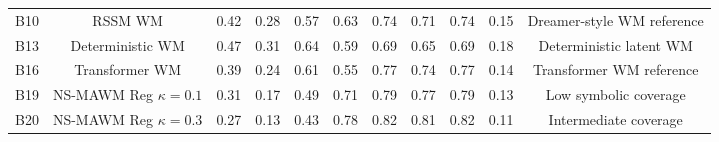 \begin{table}[h!]
{\begin{tabular}{lcccccccccc}
            \midrule

            B10                      &
            RSSM WM                  &
            0.42                     &
            0.28                     &
            0.57                     &
            0.63                     &
            0.74                     &
            0.71                     &
            0.74                     &
            0.15                     &
            Dreamer-style WM reference
            \\

            B13                      &
            Deterministic WM         &
            0.47                     &
            0.31                     &
            0.64                     &
            0.59                     &
            0.69                     &
            0.65                     &
            0.69                     &
            0.18                     &
            Deterministic latent WM
            \\

            B16                      &
            Transformer WM           &
            0.39                     &
            0.24                     &
            0.61                     &
            0.55                     &
            0.77                     &
            0.74                     &
            0.77                     &
            0.14                     &
            Transformer WM reference
            \\

            \midrule

            B19                      &
            NS-MAWM Reg $\kappa=0.1$ &
            0.31                     &
            0.17                     &
            0.49                     &
            0.71                     &
            0.79                     &
            0.77                     &
            0.79                     &
            0.13                     &
            Low symbolic coverage
            \\

            B20                      &
            NS-MAWM Reg $\kappa=0.3$ &
            0.27                     &
            0.13                     &
            0.43                     &
            0.78                     &
            0.82                     &
            0.81                     &
            0.82                     &
            0.11                     &
            Intermediate coverage
            \\


\end{tabular}}
\end{table}
